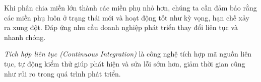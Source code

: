 Khi phân chia miền lớn thành các miền phụ nhỏ hơn, chúng ta cần đảm bảo rằng các miền phụ luôn ở trạng thái mới và hoạt động tốt như kỳ vọng, hạn chế xảy ra xung đột. Đáp ứng nhu cầu doanh nghiệp phát triển thay đổi liên tục và nhanh chóng.

\emph{Tích hợp liên tục (Continuous Integration)} là công nghệ tích hợp mã nguồn liên tục, tự động kiểm thử giúp phát hiện và sửa lỗi sớm hơn, giảm thời gian cũng như rủi ro trong quá trình phát triển.







